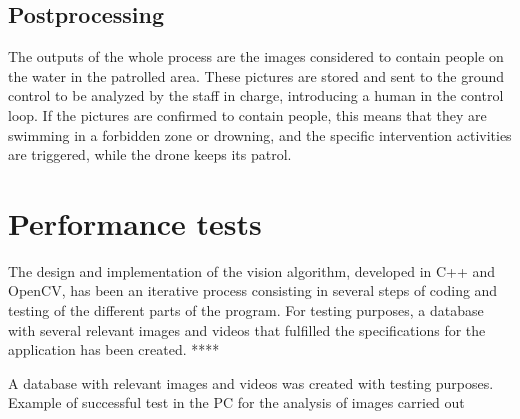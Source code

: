 \subsection{Postprocessing}
The outputs of the whole process are the images considered to contain people on the water in the patrolled area. 
These pictures are stored and sent to the ground control to be analyzed by the staff in charge, introducing a human in the control loop.
If the pictures are confirmed to contain people, this means that they are swimming in a forbidden zone or drowning, and the specific intervention activities are triggered, while the drone keeps its patrol. 

\section{Performance tests}
The design and implementation of the vision algorithm, developed in C++ and OpenCV, has been an iterative process consisting in several steps of coding and testing of the different parts of the program. 
For testing purposes, a database with several relevant images and videos that fulfilled the specifications for the application has been created. ****

A database with relevant images and videos was created with testing purposes.\\

Example of successful test in the PC for the analysis of images carried out

